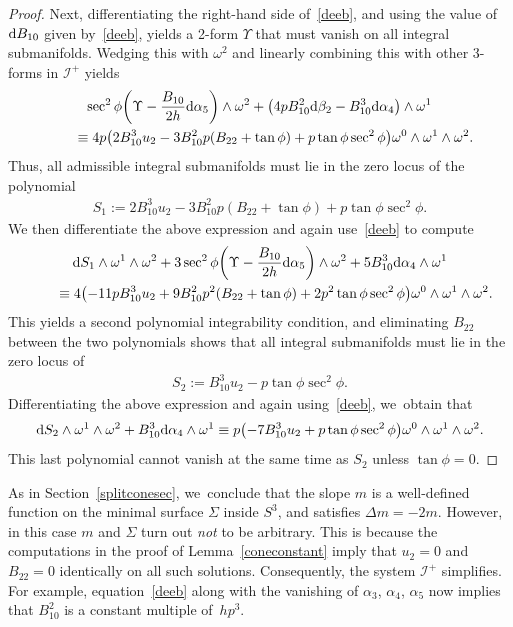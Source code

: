 \documentclass[10pt,a4paper]{amsart}
\def\calI{\mathcal{I}}
\def\w{\omega}
\numberwithin{equation}{section}
\begin{document}
\begin{proof}
Next, differentiating the right-hand side of~\eqref{deeb}, and using the value of ${\rm d}B_{10}$ given by~\eqref{deeb}, yields a 2-form $\Upsilon$ that must vanish on all integral submanifolds. Wedging this with $\w^2$ and linearly combining this with other 3-forms in $\calI^+$ yields
\begin{gather*}
\sec^2\phi \bigg(\Upsilon -\dfrac{B_{10}}{2h} {\rm d}\alpha_5\bigg)\wedge \w^2 + \big(4p B_{10}^2 {\rm d}\beta_2-B_{10}^3 {\rm d}\alpha_4\big) \wedge \w^1
\\ \qquad
{} \equiv 4p\big( 2B_{10}^3 u_2 -3B_{10}^2 p (B_{22}+\tan\phi) + p\tan\phi \sec^2\phi \big)\w^0 \wedge \w^1 \wedge \w^2.
\end{gather*}
Thus, all admissible integral submanifolds must lie in the zero locus of the polynomial
\begin{gather*}
S_1 := 2B_{10}^3 u_2 -3B_{10}^2 p (B_{22}+\tan\phi) + p\tan\phi \sec^2\phi.
\end{gather*}
We then differentiate the above expression and again use~\eqref{deeb} to compute
\begin{gather*}
{\rm d} S_1 \wedge \w^1 \wedge \w^2 + 3\sec^2\phi\bigg(\Upsilon -\dfrac{B_{10}}{2h} {\rm d}\alpha_5\bigg)\wedge \w^2 + 5B_{10}^3 {\rm d}\alpha_4 \wedge \w^1
\\ \qquad
{}\equiv 4\big({-}11 p B_{10}^3 u_2+9 B_{10}^2 p^2 (B_{22}+\tan\phi)+2 p^2 \tan\phi \sec^2\phi \big)\w^0 \wedge \w^1 \wedge \w^2.
\end{gather*}
This yields a second polynomial integrability condition, and eliminating $B_{22}$ between the two polynomials shows that all integral submanifolds must lie in the zero locus of
\begin{gather*}
S_2:= B_{10}^3 u_2 - p\tan\phi \sec^2\phi.
\end{gather*}
Differentiating the above expression and again using~\eqref{deeb}, we~obtain that
\begin{gather*}
{\rm d}S_2 \wedge \w^1 \wedge \w^2 +B_{10}^3 {\rm d}\alpha_4 \wedge \w^1 \equiv p\big({-}7B_{10}^3 u_2 + p\tan\phi \sec^2\phi\big)\w^0 \wedge \w^1 \wedge \w^2.
\end{gather*}
This last polynomial cannot vanish at the same time as $S_2$ unless $\tan\phi=0$.
\end{proof}

As in Section~\ref{splitconesec}, we~conclude that the slope $m$ is a well-defined function on the minimal surface $\Sigma$ inside $S^3$, and satisfies $\Delta m = -2m$. However, in this case $m$ and $\Sigma$ turn out \emph{not} to be arbitrary. This is because the computations in the proof of Lemma~\ref{coneconstant} imply that $u_2=0$ and $B_{22}=0$ identically on all such solutions. Consequently, the system $\calI^+$ simplifies. For example, equation~\eqref{deeb} along with the vanishing of $\alpha_3$, $\alpha_4$, $\alpha_5$ now implies that $B_{10}^2$ is a constant multiple of~$hp^3$.
\end{document}
